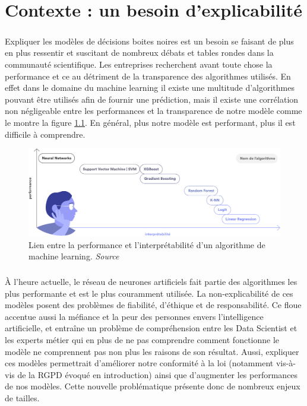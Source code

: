 \chapter{Contexte : un besoin d'explicabilité}
\paragraph{}Expliquer les modèles de décisions boites noires est un besoin se faisant de plus en plus ressentir et suscitant de nombreux débats et tables rondes dans la communauté scientifique. Les entreprises recherchent avant toute chose la performance et ce au détriment de la transparence des algorithmes utilisés. En effet dans le domaine du machine learning il existe une multitude d'algorithmes pouvant être utilisés afin de fournir une prédiction, mais il existe une corrélation non négligeable entre les performances et la transparence de notre modèle comme le montre la figure \ref{performanceAndInterpretabilite}. En général, plus notre modèle est performant, plus il est difficile à comprendre.

\begin{figure}[h]
\centering
\includegraphics[scale=0.15]{src_img/performanceAndInterpretabilite.png}
\caption{Lien entre la performance et l'interprétabilité d'un algorithme de machine learning. \textit{Source \cite{hippocrate}}}
\label{performanceAndInterpretabilite}
\end{figure}

\paragraph{}À l'heure actuelle, le réseau de neurones artificiels fait partie des algorithmes les plus performante et est le plus couramment utilisée.
La non-explicabilité de ces modèles posent des problèmes de fiabilité, d'éthique et de responsabilité. Ce floue accentue aussi la méfiance et la peur des personnes envers l'intelligence artificielle, et entraîne un problème de compréhension entre les Data Scientist et les experts métier qui en plus de ne pas comprendre comment fonctionne le modèle ne comprennent pas non plus les raisons de son résultat. Aussi, expliquer ces modèles permettrait d'améliorer notre conformité à la loi (notamment vis-à-vis de la RGPD évoqué en introduction) ainsi que d'augmenter les performances de nos modèles. Cette nouvelle problématique présente donc de nombreux enjeux de tailles.


